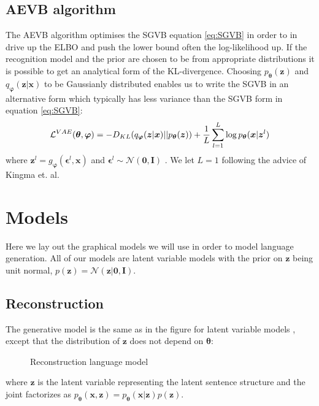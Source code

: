 \subsection{AEVB algorithm}
The AEVB algorithm optimises the SGVB equation \eqref{eq:SGVB} in order to in
drive up the ELBO and push the lower bound often the log-likelihood up. If the
recognition model and the prior are chosen to be from appropriate distributions
it is possible to get an analytical form of the KL-divergence. Choosing
$p_{\bm{\theta}}(\bm{z})$ and $q_{\bm{\varphi}}(\bm{z} | \bm{x})$ to be
Gaussianly distributed enables us to write the SGVB in an alternative form which
typically has less variance than the SGVB form in equation \eqref{eq:SGVB}:
\begin{equation}
  \label{eq:SGVB_analytical_KL}
  \mathcal{L}^{VAE}(\bm{\theta}, \bm{\varphi}) = -D_{KL}(q_{\bm{\varphi}}(\bm{z} | \bm{x}) || p_{\bm{\theta}}(\bm{z})) + \frac{1}{L} \sum_{l=1}^L \log p_{\bm{\theta}}(\bm{x} | \bm{z}^{l})
\end{equation}
where $\bm{z}^{l} = g_{\bm{\varphi}}(\bm{\epsilon}^{l}, \bm{x})$ and
$\bm{\epsilon}^{l} \sim \mathcal{N}(\bm{0},
\bm{I})$ \cite{kingma_auto-encoding_2013}. We let $L = 1$ following the advice
of Kingma et. al.

\section{Models}

Here we lay out the graphical models we will use in order to model language
generation. All of our models are latent variable models with the prior on
$\bm{z}$ being unit normal, $p(\bm{z}) = \mathcal{N}(\bm{z}| \bm{0}, \bm{I})$.

\subsection{Reconstruction}

The generative model is the same as in the figure for latent variable models
, except that the distribution of $\bm{z}$ does not depend on $\bm{\theta}$:
\begin{figure}[H]
  \center
  \label{tikz:reconstruction_model}
  \caption{Reconstruction language model}
\end{figure}
where $\bm{z}$ is the latent variable representing the latent sentence structure
and the joint factorizes as $p_{\bm{\theta}}(\bm{x}, \bm{z}) =
p_{\bm{\theta}}(\bm{x} | \bm{z})p(\bm{z})$.

